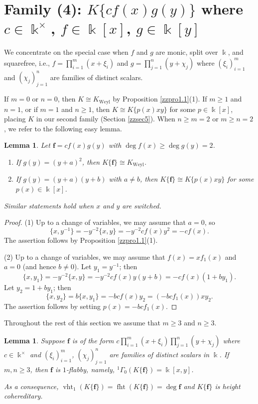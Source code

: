 \documentclass[12pt]{amsart}
\theoremstyle{plain}
\newtheorem{lemma}[theorem]{Lemma}
\numberwithin{theorem}{section}
\numberwithin{equation}{theorem}
\theoremstyle{definition}
\DeclareMathOperator{\fht}{fht}
\DeclareMathOperator{\vht}{vht}
\newcommand \bff {{\mathbf{f}}}
\DeclareMathOperator{\Weyl}{Weyl}
\newcommand \Kweyl {K_{\Weyl}}
\newcommand \kx {\Bbbk^\times}
\begin{document}

\section{Family (4): $K\{cf(x)g(y)\}$ where $c\in \Bbbk^{\times}$, $f \in \Bbbk[x]$, $g \in \Bbbk[y]$}
\label{zzsec7}

We concentrate on the special case when $f$ and $g$ are monic, split over $\Bbbk$, and squarefree, i.e.,
$f=\prod_{i=1}^m (x+\xi_i)$ and $g=\prod_{j=1}^{n} (y+\chi_j)$
where $(\xi_i)_{i=1}^{m}$ and $(\chi_j)_{j=1}^n$ 
are families of distinct scalars. 

If $m=0$ or $n=0$, then $K \cong \Kweyl$ by Proposition \ref{zzpro1.1}(1).  If $m\ge1$ and $n=1$, or if $m=1$ and $n\ge1$, then $K \cong K\{p(x)xy\}$ for some $p \in \Bbbk[x]$, placing $K$ in our second family (Section \ref{zzsec5}). When $n\geq m=2$ or $m\geq n=2$, we refer to the 
following easy lemma.

\begin{lemma}
\label{zzlem7.1}
Let $\bff= c f(x)g(y)$ with $\deg f(x)\geq \deg g(y)=2$.
\begin{enumerate}
\item[(1)]
If $g(y)=(y+a)^2$, then $K\{\bff\}\cong \Kweyl$.
\item[(2)]
If $g(y)=(y+a)(y+b)$ with $a\neq b$, then $K\{\bff\}\cong 
K\{ p(x)xy\}$ for some $p(x)\in \Bbbk[x]$.
\end{enumerate}
Similar statements hold when $x$ and $y$ are switched.
\end{lemma}

\begin{proof}
(1) Up to a change of variables, we may assume that $a=0$, so
$$\{x, y^{-1}\}
=-y^{-2} \{x,y\}=-y^{-2} cf(x) y^2
=-cf(x).$$
The assertion follows by Proposition \ref{zzpro1.1}(1).

(2) Up to a change of variables,
we may assume that $f(x)=x f_1(x)$ and $a=0$ (and hence $b\neq 0$). Let $y_1=y^{-1}$; then 
$$\{x, y_1\}=-y^{-2}\{x,y\}
=-y^{-2} c f(x) y (y+b)=
-c f(x) (1+b y_1).$$
Let $y_2= 1+b y_1$; then 
$$\{x, y_2\}=b\{x,y_1\}=-bcf(x) y_2=(-bc f_1(x)) xy_2.$$
The assertion follows by setting $p(x)=-bcf_1(x)$.
\end{proof}
Throughout the rest of 
this section we assume that $m\geq 3$ and $n\geq 3$.

\begin{lemma}
\label{zzlem7.2} 
Suppose $\bff$ is of the form 
$c\prod_{i=1}^m (x+\xi_i) \prod_{j=1}^{n} (y+\chi_j)$
where $c \in \kx$ and $(\xi_i)_{i=1}^{m}$, $(\chi_j)_{j=1}^n$ 
are families of distinct scalars in $\Bbbk$.  If $m,n\ge3$, then $\bff$ is $1$-flabby, 
namely, ${^1\Gamma}_{0}(K\{\bff\})=\Bbbk[x,y]$.

As a consequence, $\vht_1(K\{\bff\})= \fht(K\{\bff\})=\deg \bff$ and $K\{\bff\}$ is height 
cohereditary.
\end{lemma}
\end{document}
